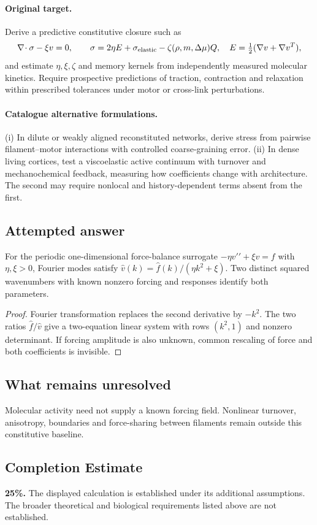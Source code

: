 \documentclass[11pt]{article}
\begin{document}
\paragraph{Original target.}
Derive a predictive constitutive closure such as
\[\nabla\!\cdot\sigma-\xi v=0,\qquad \sigma=2\eta E+\sigma_{\rm elastic}-\zeta(\rho,m,\Delta\mu)Q,\quad E=\tfrac12(\nabla v+\nabla v^T),\]
and estimate $\eta,\xi,\zeta$ and memory kernels from independently measured molecular kinetics. Require prospective predictions of traction, contraction and relaxation within prescribed tolerances under motor or cross-link perturbations.
\paragraph{Catalogue alternative formulations.}
(i) In dilute or weakly aligned reconstituted networks, derive stress from pairwise filament--motor interactions with controlled coarse-graining error. (ii) In dense living cortices, test a viscoelastic active continuum with turnover and mechanochemical feedback, measuring how coefficients change with architecture. The second may require nonlocal and history-dependent terms absent from the first.
\subsection{Attempted answer}
\begin{proposition}
For the periodic one-dimensional force-balance surrogate $-\eta v\prime\prime+\xi v=f$ with $\eta,\xi>0$, Fourier modes satisfy $\widehat v(k)=\widehat f(k)/(\eta k^2+\xi)$. Two distinct squared wavenumbers with known nonzero forcing and responses identify both parameters.
\end{proposition}
\begin{proof}
Fourier transformation replaces the second derivative by $-k^2$. The two ratios $\widehat f/\widehat v$ give a two-equation linear system with rows $(k^2,1)$ and nonzero determinant. If forcing amplitude is also unknown, common rescaling of force and both coefficients is invisible.
\end{proof}
\subsection{What remains unresolved}
Molecular activity need not supply a known forcing field. Nonlinear turnover, anisotropy, boundaries and force-sharing between filaments remain outside this constitutive baseline.
\subsection{Completion Estimate}
\textbf{25\%.} The displayed calculation is established under its additional assumptions. The broader theoretical and biological requirements listed above are not established.
\end{document}
